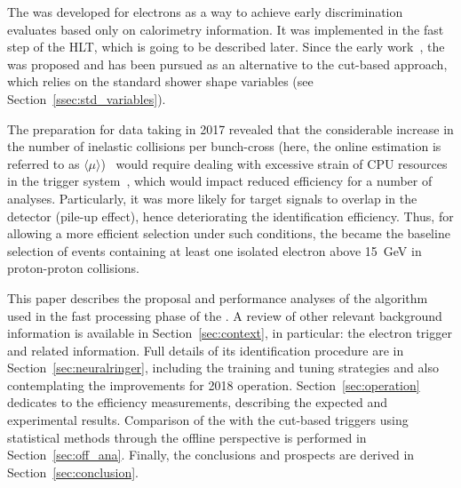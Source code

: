 The \rnn{} was developed for electrons as a way to achieve early discrimination evaluates based only on calorimetry information. It was implemented in the fast step of the HLT, which is going to be described later. Since the early work~\cite{1995_seixas_ringer}, the \rnn{} was proposed and has been pursued as an alternative to the cut-based approach, which relies on the standard shower shape variables (see Section~\ref{ssec:std_variables}).


The preparation for data taking in 2017 revealed that the considerable increase in the number of inelastic collisions per bunch-cross (here, the online estimation is referred to as $\langle \mu \rangle$)~\cite{DAPR-2013-01} would require dealing with excessive strain of CPU resources in the trigger system~\cite{ATL-DAQ-PUB-2018-002}, which would impact reduced efficiency for a number of analyses. Particularly, it was more likely for target  signals to overlap in the detector (pile-up effect), hence deteriorating the identification efficiency. Thus, for allowing a more efficient selection under such conditions, the \rnn{} became the baseline selection of events containing at least one isolated electron above \SI{15}{\GeV} in proton-proton collisions.

This paper describes the proposal and performance analyses of the \rnn{}
algorithm used in the fast processing phase of the \hlt{}. A review
of other relevant background information is available in
Section~\ref{sec:context}, in particular: the electron
trigger and related information. Full details of its identification procedure are
in Section~\ref{sec:neuralringer}, including the training and tuning strategies and also contemplating the improvements for 2018 operation. Section~\ref{sec:operation} dedicates to the efficiency measurements, describing the expected and experimental results. Comparison of the \rnn with
the cut-based triggers using statistical methods through the offline perspective
is performed in Section~\ref{sec:off_ana}. Finally, the conclusions and prospects 
are derived in Section~\ref{sec:conclusion}.






